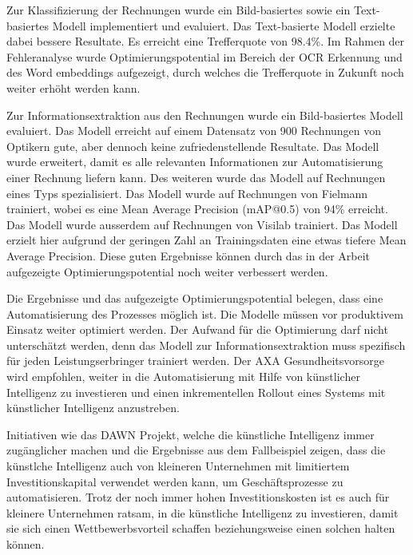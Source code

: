 {    Zur Klassifizierung der Rechnungen wurde ein Bild-basiertes sowie ein Text-basiertes Modell implementiert und evaluiert. Das Text-basierte Modell erzielte dabei bessere Resultate. Es erreicht eine Trefferquote von 98.4\%. Im Rahmen der Fehleranalyse wurde Optimierungspotential im Bereich der OCR Erkennung und des Word embeddings aufgezeigt, durch welches die Trefferquote in Zukunft noch weiter erhöht werden kann.
    
    Zur Informationsextraktion aus den Rechnungen wurde ein Bild-basiertes Modell evaluiert. Das Modell erreicht auf einem Datensatz von 900 Rechnungen von Optikern gute, aber dennoch keine zufriedenstellende Resultate. Das Modell wurde erweitert, damit es alle relevanten Informationen zur Automatisierung einer Rechnung liefern kann. Des weiteren wurde das Modell auf Rechnungen eines Typs spezialisiert. Das Modell wurde auf Rechnungen von Fielmann trainiert, wobei es eine Mean Average Precision (mAP@0.5) von 94\% erreicht. Das Modell wurde ausserdem auf Rechnungen von Visilab trainiert. Das Modell erzielt hier aufgrund der geringen Zahl an Trainingsdaten eine etwas tiefere Mean Average Precision. Diese guten Ergebnisse können durch das in der Arbeit aufgezeigte Optimierungspotential noch weiter verbessert werden. 
    
    Die Ergebnisse und das aufgezeigte Optimierungspotential belegen, dass eine Automatisierung des Prozesses möglich ist. Die Modelle müssen vor produktivem Einsatz weiter optimiert werden. Der Aufwand für die Optimierung darf nicht unterschätzt werden, denn das Modell zur Informationsextraktion muss spezifisch für jeden Leistungserbringer trainiert werden. Der AXA Gesundheitsvorsorge wird empfohlen, weiter in die Automatisierung mit Hilfe von künstlicher Intelligenz zu investieren und einen inkrementellen Rollout eines Systems mit künstlicher Intelligenz anzustreben.
    
    Initiativen wie das DAWN Projekt, welche die künstliche Intelligenz immer zugänglicher machen und die Ergebnisse aus dem Fallbeispiel zeigen, dass die künstlche Intelligenz auch von kleineren Unternehmen mit limitiertem Investitionskapital verwendet werden kann, um Geschäftsprozesse zu automatisieren. Trotz der noch immer hohen Investitionskosten ist es auch für kleinere Unternehmen ratsam, in die künstliche Intelligenz zu investieren, damit sie sich einen Wettbewerbsvorteil schaffen beziehungsweise einen solchen halten können.
}

\newpage
\null
\cleardoublepage
\tableofcontents

\newpage
\null
\cleardoublepage
{}
\cleardoublepage


